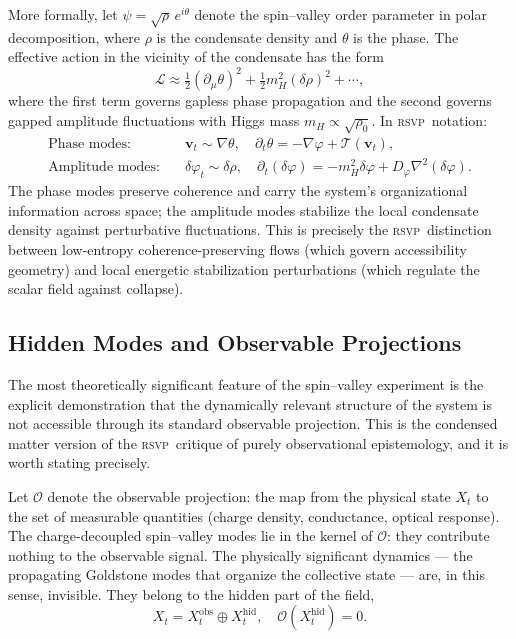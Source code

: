 \documentclass[11pt,a4paper]{article}
\theoremstyle{plain}
\theoremstyle{definition}
\theoremstyle{remark}
\newcommand{\RSVP}{\textup{\textsc{rsvp}}}
\begin{document}
More formally, let $\psi = \sqrt{\rho}\, e^{i\theta}$ denote the
spin--valley order parameter in polar decomposition, where $\rho$ is the
condensate density and $\theta$ is the phase. The effective action in the
vicinity of the condensate has the form
\[
\mathcal{L} \approx
\tfrac{1}{2}(\partial_\mu \theta)^2
+ \tfrac{1}{2}m_H^2 (\delta\rho)^2
+ \cdots,
\]
where the first term governs gapless phase propagation and the second
governs gapped amplitude fluctuations with Higgs mass $m_H \propto
\sqrt{\rho_0}$. In \RSVP\ notation:
\begin{align}
\text{Phase modes:} &\quad
\mathbf{v}_t \sim \nabla\theta, \quad
\partial_t\theta = -\nabla\varphi + \mathcal{T}(\mathbf{v}_t),\\
\text{Amplitude modes:} &\quad
\delta\varphi_t \sim \delta\rho, \quad
\partial_t(\delta\varphi) = -m_H^2 \delta\varphi + D_\varphi\nabla^2(\delta\varphi).
\end{align}
The phase modes preserve coherence and carry the system's organizational
information across space; the amplitude modes stabilize the local condensate
density against perturbative fluctuations. This is precisely the \RSVP\
distinction between low-entropy coherence-preserving flows (which
govern accessibility geometry) and local energetic stabilization
perturbations (which regulate the scalar field against collapse).

\subsection{Hidden Modes and Observable Projections}

The most theoretically significant feature of the spin--valley experiment is
the explicit demonstration that the dynamically relevant structure of the
system is not accessible through its standard observable projection. This is
the condensed matter version of the \RSVP\ critique of purely observational
epistemology, and it is worth stating precisely.

Let $\mathcal{O}$ denote the observable projection: the map from the
physical state $X_t$ to the set of measurable quantities (charge density,
conductance, optical response). The charge-decoupled spin--valley modes lie
in the kernel of $\mathcal{O}$: they contribute nothing to the observable
signal. The physically significant dynamics --- the propagating Goldstone
modes that organize the collective state --- are, in this sense, invisible.
They belong to the hidden part of the field,
\[
X_t = X_t^{\mathrm{obs}} \oplus X_t^{\mathrm{hid}},
\quad \mathcal{O}(X_t^{\mathrm{hid}}) = 0.
\]
\end{document}
